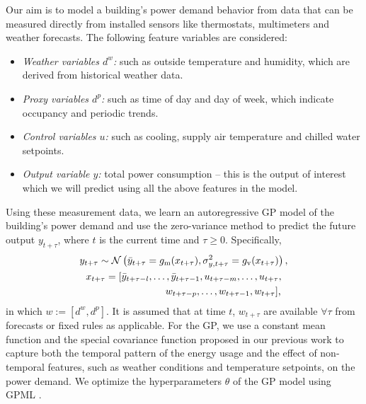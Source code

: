 Our aim is to model a building's power demand behavior from data that can be measured directly from installed sensors like thermostats, multimeters and weather forecasts.
The following feature variables are considered:
\begin{itemize}
\item \textit{Weather variables \(d^w\):} such as outside temperature and humidity, which are derived from historical weather data.
\item \textit{Proxy variables \(d^p\):} such as time of day and day of week, which indicate occupancy and periodic trends.
\item \textit{Control variables \(u\):} such as cooling, supply air temperature and chilled water setpoints.
\item \textit{Output variable \(y\):} total power consumption -- this is the output of interest which we will predict using all the above features in the model.
\end{itemize}

Using these measurement data, we learn an autoregressive GP model of the building's power demand and use the zero-variance method to predict the future output \(y_{t+\tau}\), where $t$ is the current time and \( \tau \ge 0\).
Specifically,
\begin{gather}
\label{eq:dpc:prediction}
y_{t+\tau} \sim \operatorname*{\mathcal{N}}\left(\bar{y}_{t+\tau} = g_{\mathrm m}(x_{t+\tau}), \sigma^2_{y, t+\tau} = g_{\mathrm v}(x_{t+\tau})\right), \\
x_{t + \tau} = [\bar y_{t+ \tau-l}, \dots, \bar y_{t+ \tau-1}, u_{t+ \tau-m}, \dots, u_{t+ \tau}, \nonumber \\
\qquad\qquad\qquad\qquad  w_{t+ \tau-p}, \dots, w_{t+ \tau-1}, w_{t+ \tau}]\text, \nonumber
\end{gather}
in which \(w:=[d^w, d^p]\).
It is assumed that at time \(t\), \(w_{t+\tau}\) are available \(\forall \tau \) from forecasts or fixed rules as applicable.
For the GP, we use a constant mean function and the special covariance function proposed in our previous work \cite{nghiemetal16gp} to capture both the temporal pattern of the energy usage and the effect of non-temporal features, such as weather conditions and temperature setpoints, on the power demand.
We optimize the hyperparameters \(\theta\) %
of the GP model using GPML \cite{Rasmussen2010}.


